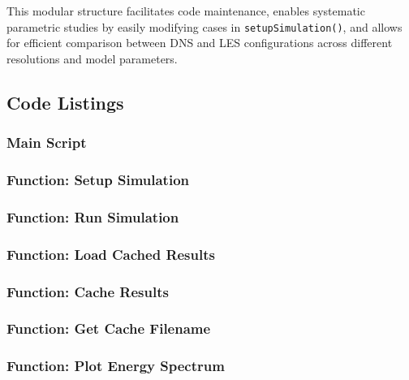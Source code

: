 This modular structure facilitates code maintenance, enables systematic parametric studies by easily modifying cases in \texttt{setupSimulation()}, and allows for efficient comparison between DNS and LES configurations across different resolutions and model parameters.

\subsection{Code Listings}

\subsubsection{Main Script}


\subsubsection{Function: Setup Simulation}


\subsubsection{Function: Run Simulation}


\subsubsection{Function: Load Cached Results}


\subsubsection{Function: Cache Results}


\subsubsection{Function: Get Cache Filename}


\subsubsection{Function: Plot Energy Spectrum}


